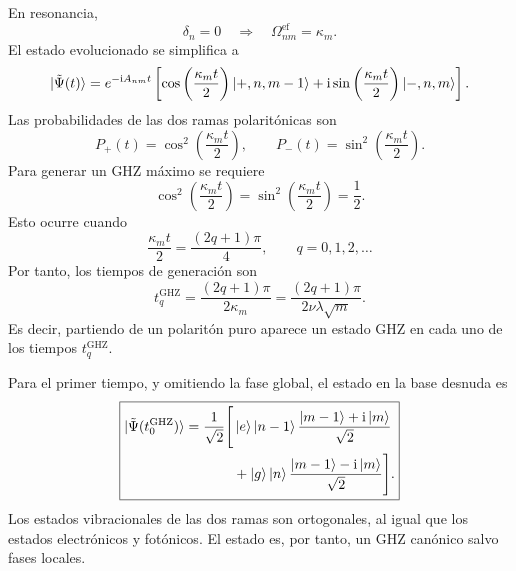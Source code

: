 \documentclass[11pt]{article}
\newcommand{\ii}{\mathrm{i}}
\begin{document}
En resonancia,
\begin{equation}
  \delta_n=0
  \quad\Longrightarrow\quad
  \Omega_{nm}^{\mathrm{ef}}=\kappa_m.
\end{equation}
El estado evolucionado se simplifica a
\begin{equation}
  \ket{\tilde\Psi(t)}
  =
  e^{-\ii A_{nm}t}
  \left[
  \cos\left(
  \frac{\kappa_mt}{2}
  \right)
  \ket{+,n,m-1}
  +
  \ii
  \sin\left(
  \frac{\kappa_mt}{2}
  \right)
  \ket{-,n,m}
  \right].
\end{equation}
Las probabilidades de las dos ramas polarit\'onicas son
\begin{equation}
  P_+(t)
  =
  \cos^2\left(
  \frac{\kappa_mt}{2}
  \right),
  \qquad
  P_-(t)
  =
  \sin^2\left(
  \frac{\kappa_mt}{2}
  \right).
\end{equation}
Para generar un GHZ m\'aximo se requiere
\begin{equation}
  \cos^2\left(
  \frac{\kappa_mt}{2}
  \right)
  =
  \sin^2\left(
  \frac{\kappa_mt}{2}
  \right)
  =
  \frac12.
\end{equation}
Esto ocurre cuando
\begin{equation}
  \frac{\kappa_mt}{2}
  =
  \frac{(2q+1)\pi}{4},
  \qquad
  q=0,1,2,\ldots
\end{equation}
Por tanto, los tiempos de generaci\'on son
\begin{equation}
  \boxed{
  t_q^{\mathrm{GHZ}}
  =
  \frac{(2q+1)\pi}{2\kappa_m}
  =
  \frac{(2q+1)\pi}{2\nu\lambda\sqrt m}.
  }
\end{equation}
Es decir, partiendo de un polarit\'on puro aparece un estado GHZ en cada uno
de los tiempos $t_q^{\mathrm{GHZ}}$.

Para el primer tiempo, y omitiendo la fase global, el estado en la base
desnuda es
\begin{equation}
  \boxed{
  \begin{aligned}
  \ket{\tilde\Psi(t_0^{\mathrm{GHZ}})}
  =
  \frac1{\sqrt2}\Bigg[&
  \ket e\ket{n-1}
  \frac{\ket{m-1}+\ii\ket m}{\sqrt2}
  \\
  &+
  \ket g\ket n
  \frac{\ket{m-1}-\ii\ket m}{\sqrt2}
  \Bigg].
  \end{aligned}
  }
\end{equation}
Los estados vibracionales de las dos ramas son ortogonales, al igual que los
estados electr\'onicos y fot\'onicos. El estado es, por tanto, un GHZ can\'onico
salvo fases locales.


\end{document}
